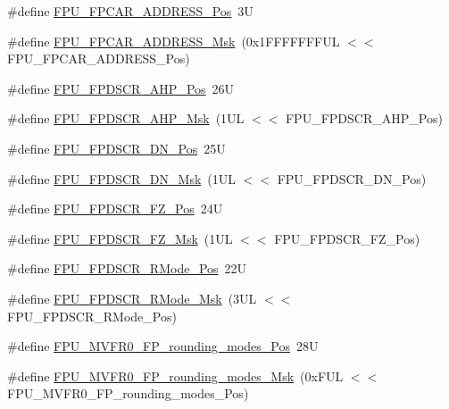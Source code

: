 \begin{DoxyCompactItemize}
\item 
\#define \hyperlink{group___c_m_s_i_s___f_p_u_gaf45377b7e45be8517ddbcf2028b80ae7}{F\+P\+U\+\_\+\+F\+P\+C\+A\+R\+\_\+\+A\+D\+D\+R\+E\+S\+S\+\_\+\+Pos}~3U
\item 
\#define \hyperlink{group___c_m_s_i_s___f_p_u_ga517d89370c81325c5387b9c3085ac554}{F\+P\+U\+\_\+\+F\+P\+C\+A\+R\+\_\+\+A\+D\+D\+R\+E\+S\+S\+\_\+\+Msk}~(0x1\+F\+F\+F\+F\+F\+F\+F\+U\+L $<$$<$ F\+P\+U\+\_\+\+F\+P\+C\+A\+R\+\_\+\+A\+D\+D\+R\+E\+S\+S\+\_\+\+Pos)
\item 
\#define \hyperlink{group___c_m_s_i_s___f_p_u_ga138f54bc002629ab3e4de814c58abb29}{F\+P\+U\+\_\+\+F\+P\+D\+S\+C\+R\+\_\+\+A\+H\+P\+\_\+\+Pos}~26U
\item 
\#define \hyperlink{group___c_m_s_i_s___f_p_u_gab2789cebebda5fda8c4e9d87e24f32be}{F\+P\+U\+\_\+\+F\+P\+D\+S\+C\+R\+\_\+\+A\+H\+P\+\_\+\+Msk}~(1\+U\+L $<$$<$ F\+P\+U\+\_\+\+F\+P\+D\+S\+C\+R\+\_\+\+A\+H\+P\+\_\+\+Pos)
\item 
\#define \hyperlink{group___c_m_s_i_s___f_p_u_ga41776b80fa450ef2ea6d3fee89aa35f2}{F\+P\+U\+\_\+\+F\+P\+D\+S\+C\+R\+\_\+\+D\+N\+\_\+\+Pos}~25U
\item 
\#define \hyperlink{group___c_m_s_i_s___f_p_u_ga40c2d4a297ca2ceffe174703a4ad17f6}{F\+P\+U\+\_\+\+F\+P\+D\+S\+C\+R\+\_\+\+D\+N\+\_\+\+Msk}~(1\+U\+L $<$$<$ F\+P\+U\+\_\+\+F\+P\+D\+S\+C\+R\+\_\+\+D\+N\+\_\+\+Pos)
\item 
\#define \hyperlink{group___c_m_s_i_s___f_p_u_gab3c2fc96e312ba47b902d5f80d9b8575}{F\+P\+U\+\_\+\+F\+P\+D\+S\+C\+R\+\_\+\+F\+Z\+\_\+\+Pos}~24U
\item 
\#define \hyperlink{group___c_m_s_i_s___f_p_u_gaae7d901442d4af97c6d22939cffc8ad9}{F\+P\+U\+\_\+\+F\+P\+D\+S\+C\+R\+\_\+\+F\+Z\+\_\+\+Msk}~(1\+U\+L $<$$<$ F\+P\+U\+\_\+\+F\+P\+D\+S\+C\+R\+\_\+\+F\+Z\+\_\+\+Pos)
\item 
\#define \hyperlink{group___c_m_s_i_s___f_p_u_ga7aeedf36be8f170dd3e276028e8e29ed}{F\+P\+U\+\_\+\+F\+P\+D\+S\+C\+R\+\_\+\+R\+Mode\+\_\+\+Pos}~22U
\item 
\#define \hyperlink{group___c_m_s_i_s___f_p_u_ga449beb50211f8e97df6b2640c82c4741}{F\+P\+U\+\_\+\+F\+P\+D\+S\+C\+R\+\_\+\+R\+Mode\+\_\+\+Msk}~(3\+U\+L $<$$<$ F\+P\+U\+\_\+\+F\+P\+D\+S\+C\+R\+\_\+\+R\+Mode\+\_\+\+Pos)
\item 
\#define \hyperlink{group___c_m_s_i_s___f_p_u_ga1ebcc9076f08013f0ea814540df03e82}{F\+P\+U\+\_\+\+M\+V\+F\+R0\+\_\+\+F\+P\+\_\+rounding\+\_\+modes\+\_\+\+Pos}~28U
\item 
\#define \hyperlink{group___c_m_s_i_s___f_p_u_gae6dc9339ac72227d5d54360bb9fbef1b}{F\+P\+U\+\_\+\+M\+V\+F\+R0\+\_\+\+F\+P\+\_\+rounding\+\_\+modes\+\_\+\+Msk}~(0x\+F\+U\+L $<$$<$ F\+P\+U\+\_\+\+M\+V\+F\+R0\+\_\+\+F\+P\+\_\+rounding\+\_\+modes\+\_\+\+Pos)

\end{DoxyCompactItemize}
